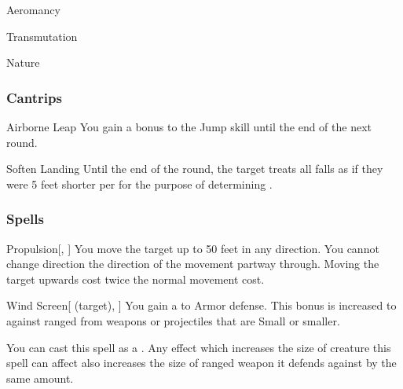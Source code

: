 
\begin{spellsection}{Aeromancy}

\begin{spellheader}
\end{spellheader}


 Transmutation

 Nature

\subsubsection{Cantrips}


\begin{freeability}{Airborne Leap}
You gain a  bonus to the Jump skill until the end of the next round.
\end{freeability}


\begin{freeability}{Soften Landing}
Until the end of the round, the target treats all falls as if they were 5 feet shorter per  for the purpose of determining .
\end{freeability}

\end{spellsection}


\subsubsection{Spells}


\lowercase{\hypertarget{spell:Propulsion}{}}\label{spell:Propulsion}
\begin{freeability}[\nth{1}]{\hypertarget{spell:Propulsion}{Propulsion}}[, ]
You move the target up to 50 feet in any direction.
You cannot change direction the direction of the movement partway through.
Moving the target upwards cost twice the normal movement cost.
\end{freeability}
\vspace{0.25em}



\lowercase{\hypertarget{spell:Wind Screen}{}}\label{spell:Wind Screen}
\begin{attuneability}[\nth{1}]{\hypertarget{spell:Wind Screen}{Wind Screen}}[ (target), ]
You gain a   to Armor defense.
This bonus is increased to  against ranged  from weapons or projectiles that are Small or smaller.

You can cast this spell as a .
Any effect which increases the size of creature this spell can affect also increases the size of ranged weapon it defends against by the same amount.
\end{attuneability}
\vspace{0.25em}



